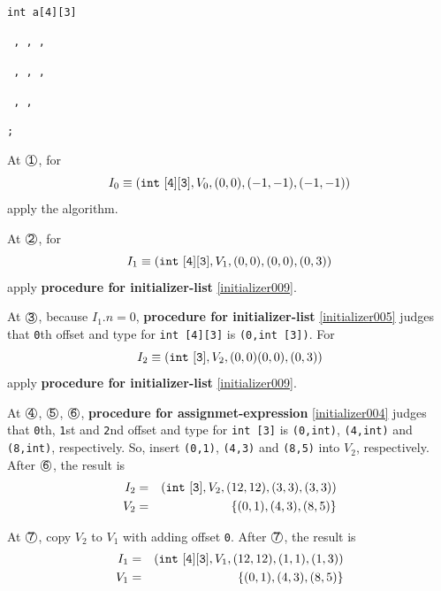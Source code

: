 \begin{Example}

\

{\tt int a[4][3] }
{\tt {}}

{\tt {}
,
,
,}

{\tt {}
,
,
,}

{\tt {}
,
,
}

{\tt {};}




\noindent
At $\MARU{\tt 1}$, for
\[
I_0 \equiv ({\tt{int\,\,[4][3]}},V_0,(0,0),(-1,-1),(-1,-1)) 
\]
apply the algorithm.

\noindent
At $\MARU{\tt 2}$, for
\[
I_1 \equiv ({\tt{int\,\,[4][3]}},V_1,(0,0),(0,0),(0,3)) 
\]
apply {\bf procedure for initializer-list} \ref{initializer009}.

\noindent
At $\MARU{\tt 3}$, because $I_1.n = 0$,
{\bf procedure for initializer-list}
\ref{initializer005} judges that
{\tt{0}}th offset and type for {\tt int [4][3]} is {\tt (0,int [3])}.
For
\[
I_2 \equiv ({\tt{int\,\,[3]}},V_2,(0,0)(0,0),(0,3)) 
\]
apply {\bf procedure for initializer-list}
\ref{initializer009}.

\noindent
At $\MARU{\tt 4}$, $\MARU{\tt 5}$, $\MARU{\tt 6}$,
{\bf procedure for assignmet-expression}
\ref{initializer004} judges that
{\tt 0}th, {\tt 1}st and {\tt 2}nd offset and type
for {\tt int [3]} is {\tt (0,int)}, {\tt (4,int)} and {\tt (8,int)},
respectively.
So, insert {\tt (0,1)}, {\tt (4,3)} and {\tt (8,5)} into $V_2$,
respectively.
After $\MARU{\tt 6}$, the result is
\begin{eqnarray*}
I_2 & = & ({\tt{int\,\,[3]}},V_2,(12,12),(3,3),(3,3)) \\
V_2 & = & \{ (0,1),(4,3),(8,5) \}
\end{eqnarray*}

\noindent
At $\MARU{\tt 7}$,
copy $V_2$ to $V_1$ with adding offset {\tt 0}.
After $\MARU{\tt 7}$, the result is
\begin{eqnarray*}
I_1 & = & ({\tt{int\,\,[4][3]}},V_1,(12,12),(1,1),(1,3)) \\
V_1 & = & \{ (0,1),(4,3),(8,5) \}
\end{eqnarray*}


\end{Example}
